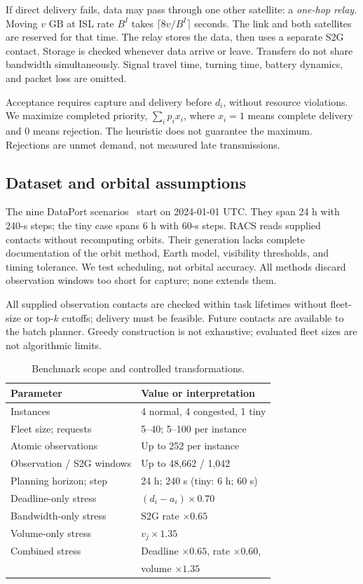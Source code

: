 \documentclass[conference]{IEEEtran}
\begin{document}
If direct delivery fails, data may pass through one other satellite: a \emph{one-hop relay}. Moving $v$ GB at ISL rate $B^{I}$ takes $\lceil8v/B^{I}\rceil$ seconds. The link and both satellites are reserved for that time. The relay stores the data, then uses a separate S2G contact. Storage is checked whenever data arrive or leave. Transfers do not share bandwidth simultaneously. Signal travel time, turning time, battery dynamics, and packet loss are omitted.

Acceptance requires capture and delivery before $d_i$, without resource violations. We maximize completed priority, $\sum_i p_ix_i$, where $x_i=1$ means complete delivery and $0$ means rejection. The heuristic does not guarantee the maximum. Rejections are unmet demand, not measured late transmissions.

\subsection{Dataset and orbital assumptions}
The nine DataPort scenarios~\cite{dataset} start on 2024-01-01 UTC. They span 24 h with 240-s steps; the tiny case spans 6 h with 60-s steps. RACS reads supplied contacts without recomputing orbits. Their generation lacks complete documentation of the orbit method, Earth model, visibility thresholds, and timing tolerance. We test scheduling, not orbital accuracy. All methods discard observation windows too short for capture; none extends them.

All supplied observation contacts are checked within task lifetimes without fleet-size or top-$k$ cutoffs; delivery must be feasible. Future contacts are available to the batch planner. Greedy construction is not exhaustive; evaluated fleet sizes are not algorithmic limits.

\begin{table}[t]
\caption{Benchmark scope and controlled transformations.}
\label{tab:setup}\centering\footnotesize
\begin{tabular}{@{}ll@{}}\toprule
Parameter & Value or interpretation\\\midrule
Instances & 4 normal, 4 congested, 1 tiny\\
Fleet size; requests & 5--40; 5--100 per instance\\
Atomic observations & Up to 252 per instance\\
Observation / S2G windows & Up to 48,662 / 1,042\\
Planning horizon; step & 24 h; 240 s (tiny: 6 h; 60 s)\\
Deadline-only stress & $(d_i-a_i)\times0.70$\\
Bandwidth-only stress & S2G rate $\times0.65$\\
Volume-only stress & $v_j\times1.35$\\
Combined stress & Deadline $\times0.65$, rate $\times0.60$,\\
& volume $\times1.35$\\\bottomrule
\end{tabular}
\end{table}
\end{document}
